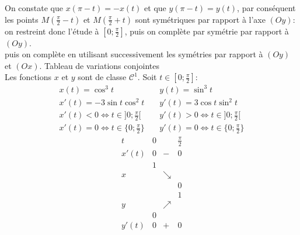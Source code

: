 {\begin{enumerate}
{\begin{itemize}
On constate que $x(\pi-t)=-x(t)$ et que $y(\pi-t)=y(t)$, par conséquent les points $M(\frac{\pi}{2}-t)$ et $M(\frac{\pi}{2}+t)$ sont symétriques par rapport à l'axe $(Oy)$: on restreint donc l'étude à $[0;\frac{\pi}{2}]$, puis on complète par symétrie par rapport à $(Oy)$.\\
 puis on complète
en utilisant successivement les symétries par rapport à $(Oy)$ et $(Ox)$.
Tableau de variations conjointes\\
Les fonctions $x$ et $y$ sont de classe $\mathcal{C}^1$. Soit $t\in[0;\frac{\pi}{2}]$:
$$\begin{array}{lcl}
x(t)=\cos^3t&\ &y(t)=\sin^3t\\
x'(t)=-3\sin t\cos^2t&\ &y'(t)=3\cos t\sin^2t\\
x'(t)<0\Longleftrightarrow t\in]0;\frac{\pi}{2}[&\ &y'(t)>0\Longleftrightarrow t\in]0;\frac{\pi}{2}[\\
x'(t)=0\Longleftrightarrow t\in\{0;\frac{\pi}{2}\} &\ &y'(t)=0\Longleftrightarrow t\in\{0;\frac{\pi}{2}\}
\end{array}$$
$$\begin{array}{c|lcr}
t&0&\ &\frac{\pi}{2}\\\hline
x'(t)&0&-&0\\\hline
\ &1 &\ &\ \\
x&\ &\searrow &\ \\
\ & &\ &0 \\\hline
\ &\ &\ &1 \\
y&\ &\nearrow &\ \\
\ &0 &\ & \\\hline
y'(t)&0&+&0\\
\end{array}$$


\end{itemize}}
\end{enumerate}}
